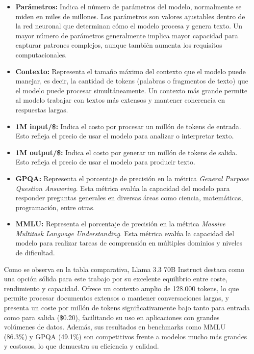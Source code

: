 \documentclass{article}
\begin{document}
\begin{itemize}
    \item \textbf{Parámetros:} Indica el número de parámetros del modelo, normalmente se miden en miles de millones. Los parámetros son valores ajustables dentro de la red neuronal que determinan cómo el modelo procesa y genera texto. Un mayor número de parámetros generalmente implica mayor capacidad para capturar patrones complejos, aunque también aumenta los requisitos computacionales.

    \item \textbf{Contexto:} Representa el tamaño máximo del contexto que el modelo puede manejar, es decir, la cantidad de tokens (palabras o fragmentos de texto) que el modelo puede procesar simultáneamente. Un contexto más grande permite al modelo trabajar con textos más extensos y mantener coherencia en respuestas largas.

    \item \textbf{1M input/\$:} Indica el costo por procesar un millón de tokens de entrada. Esto refleja el precio de usar el modelo para analizar o interpretar texto.

    \item \textbf{1M output/\$:} Indica el costo por generar un millón de tokens de salida. Esto refleja el precio de usar el modelo para producir texto.

    \item \textbf{GPQA:} Representa el porcentaje de precisión en la métrica \textit{General Purpose Question Answering}. Esta métrica evalúa la capacidad del modelo para responder preguntas generales en diversas áreas como ciencia, matemáticas, programación, entre otras.

    \item \textbf{MMLU:} Representa el porcentaje de precisión en la métrica \textit{Massive Multitask Language Understanding}. Esta métrica evalúa la capacidad del modelo para realizar tareas de comprensión en múltiples dominios y niveles de dificultad.
\end{itemize}

Como se observa en la tabla comparativa, Llama 3.3 70B Instruct destaca como una opción sólida para este trabajo por su excelente equilibrio entre coste, rendimiento y capacidad. Ofrece un contexto amplio de 128.000 tokens, lo que permite procesar documentos extensos o mantener conversaciones largas, y presenta un coste por millón de tokens significativamente bajo tanto para entrada como para salida (\$0.20), facilitando su uso en aplicaciones con grandes volúmenes de datos. Además, sus resultados en benchmarks como MMLU (86.3\%) y GPQA (49.1\%) son competitivos frente a modelos mucho más grandes y costosos, lo que demuestra su eficiencia y calidad.
\end{document}
